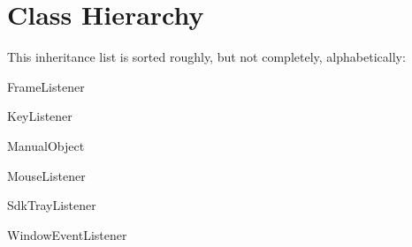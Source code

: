 \section{Class Hierarchy}
This inheritance list is sorted roughly, but not completely, alphabetically\+:\begin{DoxyCompactList}
\item Frame\+Listener\begin{DoxyCompactList}
\item {}
\begin{DoxyCompactList}
\item {}
\end{DoxyCompactList}
\end{DoxyCompactList}
\item Key\+Listener\begin{DoxyCompactList}
\item {}
\end{DoxyCompactList}
\item Manual\+Object\begin{DoxyCompactList}
\item {}
\end{DoxyCompactList}
\item Mouse\+Listener\begin{DoxyCompactList}
\item {}
\end{DoxyCompactList}
\item Sdk\+Tray\+Listener\begin{DoxyCompactList}
\item {}
\end{DoxyCompactList}
\item Window\+Event\+Listener\begin{DoxyCompactList}
\item {}
\end{DoxyCompactList}
\end{DoxyCompactList}
